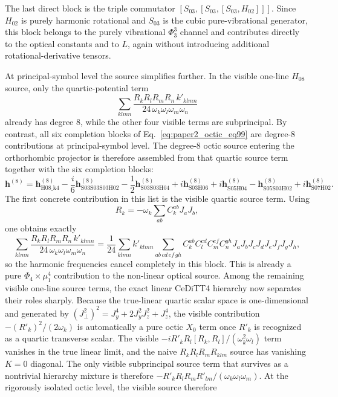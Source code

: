 \documentclass[aip,jcp,reprint,floatfix]{revtex4-2}
\begin{document}
The last direct block is the triple commutator
\([S_{03},[S_{03},[S_{03},H_{02}]]]\). Since \(H_{02}\) is purely harmonic
rotational and \(S_{03}\) is the cubic pure-vibrational generator, this block
belongs to the purely vibrational \(\Phi_3^3\) channel and contributes
directly to the optical constants and to \(L\), again without introducing
additional rotational-derivative tensors.

At principal-symbol level the source simplifies further. In the visible
one-line \(H_{08}\) source, only the quartic-potential term
\[
\sum_{klmn}\frac{R_kR_lR_mR_n\,k'_{klmn}}{24\,\omega_k\omega_l\omega_m\omega_n}
\]
already has degree 8, while the other four visible terms are subprincipal. By
contrast, all six completion blocks of Eq.~\eqref{eq:paper2_octic_eq99} are
degree-8 contributions at principal-symbol level. The degree-8 octic source
entering the orthorhombic projector is therefore assembled from that quartic
source term together with the six completion blocks:
\[
\mathbf h^{(8)}
=
\mathbf h^{(8)}_{\mathrm{H08\_k4}}
-\frac{i}{6}\mathbf h^{(8)}_{\mathrm{S03S03S03H02}}
-\frac12\mathbf h^{(8)}_{\mathrm{S03S03H04}}
+i\mathbf h^{(8)}_{\mathrm{S03H06}}
+i\mathbf h^{(8)}_{\mathrm{S05H04}}
-\mathbf h^{(8)}_{\mathrm{S05S03H02}}
+i\mathbf h^{(8)}_{\mathrm{S07H02}}.
\]
The first concrete contribution in this list is the visible quartic source
term. Using
\[
R_k=-\omega_k\sum_{ab} C_k^{ab}J_aJ_b,
\]
one obtains exactly
\[
\sum_{klmn}\frac{R_kR_lR_mR_n\,k'_{klmn}}{24\,\omega_k\omega_l\omega_m\omega_n}
=
\frac{1}{24}
\sum_{klmn}k'_{klmn}
\sum_{ab\,cd\,ef\,gh}
C_k^{ab}C_l^{cd}C_m^{ef}C_n^{gh}
J_aJ_bJ_cJ_dJ_eJ_fJ_gJ_h,
\]
so the harmonic frequencies cancel completely in this block. This is already a
pure \(\Phi_4\times\mu_1^4\) contribution to the non-linear optical source.
Among the remaining visible one-line source terms, the exact linear CeDiTT4
hierarchy now separates their roles sharply. Because the true-linear quartic
scalar space is one-dimensional and generated by
\((J_\perp^2)^2=J_y^4+2J_y^2J_z^2+J_z^4\), the visible contribution
\(- (R'_k)^2/(2\omega_k)\) is automatically a pure octic \(X_0\) term once
\(R'_k\) is recognized as a quartic transverse scalar. The visible
\(-iR'_kR_l[R_k,R_l]/(\omega_k^2\omega_l)\) term vanishes in the true linear
limit, and the naive \(R_kR_lR_mR_{klm}\) source has vanishing \(K=0\)
diagonal. The only visible subprincipal source term that survives as a
nontrivial hierarchy mixture is therefore
\(-R'_kR_lR_mR'_{lm}/(\omega_k\omega_l\omega_m)\).
At the rigorously isolated octic level, the visible source therefore
\end{document}

